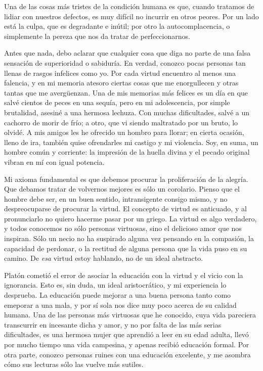 \documentclass[a4paper, 12pt]{article}
\begin{document}
Una de las cosas más tristes de la condición humana es que, cuando tratamos de
lidiar con nuestros defectos, es muy difícil no incurrir en otros peores. Por
un lado está la culpa, que es degradante e inútil; por otro la
autocomplacencia, o simplemente la pereza que nos da tratar de
perfeccionarnos. 

Antes que nada, debo aclarar que cualquier cosa que diga no parte de una falsa
sensación de superioridad o sabiduría. En verdad, conozco pocas personas tan
llenas de rasgos infelices como yo. Por cada virtud encuentro al menos una
falencia, y en mi memoria atesoro ciertas cosas que me enorgullecen y otras
tantas que me avergüenzan. Una de mis memorias más felices es un día en que
salvé cientos de peces en una sequía, pero en mi adolescencia, por simple
brutalidad, asesiné a una hermosa lechuza. Con muchas dificultades, salvé a un
cachorro de morir de frío; a otro, que vi siendo maltratado por un bruto, lo
olvidé. A mis amigos les he ofrecido un hombro para llorar; en cierta ocasión,
lleno de ira, también quise ofrendarles mi castigo y mi violencia. Soy, en
suma, un hombre común y corriente: la impresión de la huella divina y el pecado
original vibran en mí con igual potencia.

Mi axioma fundamental es que debemos procurar la proliferación de la alegría.
Que debamos tratar de volvernos mejores es sólo un corolario. Pienso que el
hombre debe ser, en un buen sentido, intransigente consigo mismo, y no
despreocuparse de procurar la virtud. El concepto de virtud es anticuado, y al
pronunciarlo no quiero hacerme pasar por un griego. La virtud es algo
verdadero, y todos conocemos no sólo personas virtuosas, sino el delicioso amor
que nos inspiran. Sólo un necio no ha suspirado alguna vez pensando en la
compasión, la capacidad de perdonar, o la rectitud de alguna persona que la
vida puso en su camino. De \textit{esa} virtud estoy hablando, no de un ideal
abstracto.

Platón cometió el error de asociar la educación con la virtud y el vicio con la
ignorancia. Esto es, sin duda, un ideal aristocrático, y mi experiencia lo
desprueba. La educación puede mejorar a una buena persona tanto como emeporar a
una mala, y por sí sola nos dice muy poco acerca de su calidad humana. Una de
las personas más virtuosas que he conocido, cuya vida pareciera transcurrir en
incesante dicha y amor, y no por falta de las más serias dificultades, es una
hermosa mujer que aprendió a leer en su edad adulta, llevó por mucho tiempo una
vida campesina, y apenas recibió educación formal. Por otra parte, conozco
personas ruines con una educación excelente, y me asombra cómo sus lecturas
sólo las vuelve más sutiles.
\end{document}
